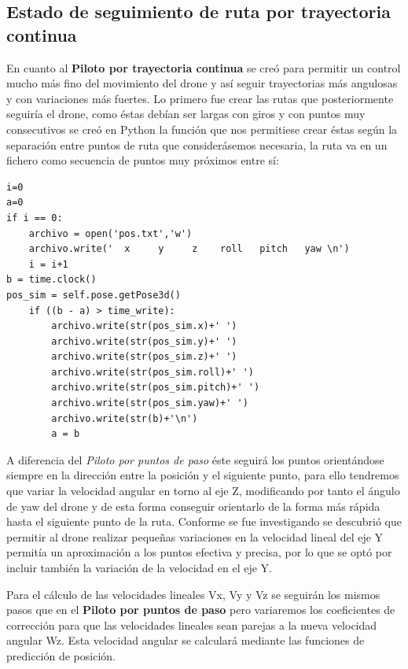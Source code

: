 \subsection{Estado de seguimiento de ruta por trayectoria continua}
\hspace{1cm} En cuanto al \textbf{Piloto por trayectoria continua} se creó para permitir un control mucho más fino del movimiento del drone y así seguir
trayectorias más angulosas y con variaciones más fuertes. Lo primero fue crear las rutas que posteriormente seguiría el drone, como éstas debían ser largas con giros y con puntos muy consecutivos se creó en Python la función que nos permitiese crear éstas según la separación entre puntos de ruta que considerásemos necesaria, la ruta va en un fichero como secuencia de puntos muy próximos entre sí: 
\begin{lstlisting}[backgroundcolor=\color{gray!15}]
i=0
a=0
if i == 0:
    archivo = open('pos.txt','w')
    archivo.write('  x     y     z    roll   pitch   yaw \n')
    i = i+1
b = time.clock()
pos_sim = self.pose.getPose3d()
    if ((b - a) > time_write):
        archivo.write(str(pos_sim.x)+' ')
        archivo.write(str(pos_sim.y)+' ')
        archivo.write(str(pos_sim.z)+' ')
        archivo.write(str(pos_sim.roll)+' ')
        archivo.write(str(pos_sim.pitch)+' ')
        archivo.write(str(pos_sim.yaw)+' ')
        archivo.write(str(b)+'\n')
        a = b 
\end{lstlisting}

\hspace{1cm} A diferencia del \textit{Piloto por puntos de paso} éste seguirá los puntos orientándose siempre en la dirección entre la posición y el siguiente punto, para ello tendremos que variar la velocidad angular en torno al eje Z, modificando por tanto el ángulo de yaw del drone y de esta forma conseguir orientarlo de la forma más rápida hasta el siguiente punto de la ruta. Conforme se fue investigando se descubrió que permitir al drone realizar pequeñas variaciones en la velocidad lineal del eje Y permitía un aproximación a los puntos efectiva y precisa, por lo que se optó por incluir también la variación de la velocidad en el eje Y.

\hspace{1cm} Para el cálculo de las velocidades lineales Vx, Vy y Vz se seguirán los mismos pasos que en el \textbf{Piloto por puntos de paso} pero variaremos los coeficientes de corrección para que las velocidades lineales sean parejas a la nueva velocidad angular Wz. Esta velocidad angular se calculará mediante las funciones de predicción de posición. 

